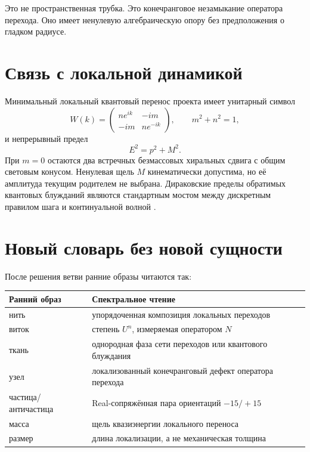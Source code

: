 Это не пространственная трубка. Это конечранговое незамыкание оператора
перехода. Оно имеет ненулевую алгебраическую опору без предположения о
гладком радиусе.

\section{Связь с локальной динамикой}

Минимальный локальный квантовый перенос проекта имеет унитарный символ
\begin{equation}
 W(k)=
 \begin{pmatrix}
 n e^{ik}&-im\\
 -im&n e^{-ik}
 \end{pmatrix},
 \qquad m^2+n^2=1,
\end{equation}
и непрерывный предел
\begin{equation}
 E^2=p^2+M^2.
\end{equation}
При $m=0$ остаются два встречных безмассовых хиральных сдвига с общим
световым конусом. Ненулевая щель $M$ кинематически допустима, но её
амплитуда текущим родителем не выбрана. Дираковские пределы обратимых
квантовых блужданий являются стандартным мостом между дискретным правилом
шага и континуальной волной
\cite{transition-bisio-dariano-tosini2012,
transition-arrighi-forets-nesme2013}.

\section{Новый словарь без новой сущности}

После решения ветви ранние образы читаются так:
\begin{center}
\begin{tabular}{ll}
\toprule
Ранний образ & Спектральное чтение\\
\midrule
нить & упорядоченная композиция локальных переходов\\
виток & степень $U^n$, измеряемая оператором $N$\\
ткань & однородная фаза сети переходов или квантового блуждания\\
узел & локализованный конечранговый дефект оператора перехода\\
частица/античастица & Real-сопряжённая пара ориентаций $-15/+15$\\
масса & щель квазиэнергии локального переноса\\
размер & длина локализации, а не механическая толщина\\
\bottomrule
\end{tabular}
\end{center}

